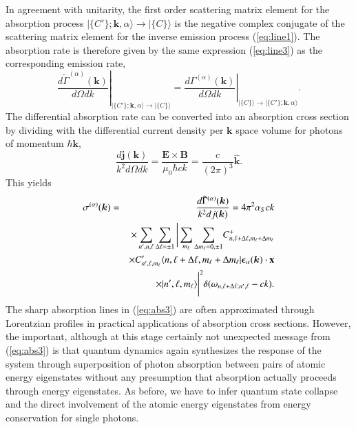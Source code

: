 \documentclass[final,3p,12pt]{elsarticle3}
\begin{document}
In agreement with unitarity, the first order scattering matrix element for the 
absorption process $\bm{|}\{C'\};\bm{k},\alpha\bm{\rangle}\to\bm{|}\{C\}\bm{\rangle}$
is the negative complex conjugate of the scattering matrix element for the 
inverse emission process (\ref{eq:line1}). The absorption rate is therefore 
given by the same expression (\ref{eq:line3}) as the corresponding emission rate,
\[
\left.\frac{d\tilde{\Gamma}^{(\alpha)}(\bm{k})}{d\Omega dk}
\right|_{\bm{|}\{C'\};\bm{k},\alpha\bm{\rangle}\to\bm{|}\{C\}\bm{\rangle}}
=\left.\frac{d\Gamma^{(\alpha)}(\bm{k})}{d\Omega dk}
\right|_{\bm{|}\{C\}\bm{\rangle}\to\bm{|}\{C'\};\bm{k},\alpha\bm{\rangle}}.
\]
The differential absorption rate can be converted into an absorption
cross section by dividing with the differential current
density per $\bm{k}$ space volume for photons of momentum $\hbar\bm{k}$,
\begin{equation}
\frac{d\bm{j}(\bm{k})}{k^2d\Omega dk}
=\frac{\bm{E}\times\bm{B}}{\mu_0\hbar ck}
=\frac{c}{(2\pi)^3}\hat{\bm{k}}.
\end{equation}
This yields
\begin{eqnarray} \nonumber
\sigma^{(\alpha)}(\bm{k})&=&\frac{d\tilde{\Gamma}^{(\alpha)}(\bm{k})}{k^2dj(\bm{k})}
=4\pi^2\alpha_S ck
\\ \nonumber
&&\times
\sum_{n',n,\ell}\sum_{\Delta\ell=\pm 1}\Bigg|
\sum_{m_\ell}\sum_{\Delta m_\ell=0,\pm 1}\!
C^+_{n,\ell+\Delta\ell,m_\ell+\Delta m_\ell}
\\ \nonumber
&&\times
C'_{n',\ell,m_\ell}\langle n,\ell+\Delta\ell,m_\ell+\Delta m_\ell|
\bm{\epsilon}_\alpha(\bm{k})\cdot\mathrm{\bf x}
\\ \label{eq:abs3}
&&\times
|n',\ell,m_\ell\rangle\Bigg|^2
\delta(\omega_{n,\ell+\Delta\ell;n',\ell}-ck).
\end{eqnarray}
The sharp absorption lines in (\ref{eq:abs3}) are often approximated 
through Lorentzian profiles in practical applications of absorption
cross sections.
However, the important, although at this stage certainly not unexpected
message from (\ref{eq:abs3}) is that quantum dynamics again synthesizes
the response of the system through superposition of photon absorption
between pairs of atomic energy eigenstates without any presumption that 
absorption actually proceeds through energy eigenstates. As before, we 
have to infer quantum state collapse and the direct involvement of the 
atomic energy eigenstates from energy conservation for single photons.
\end{document}

